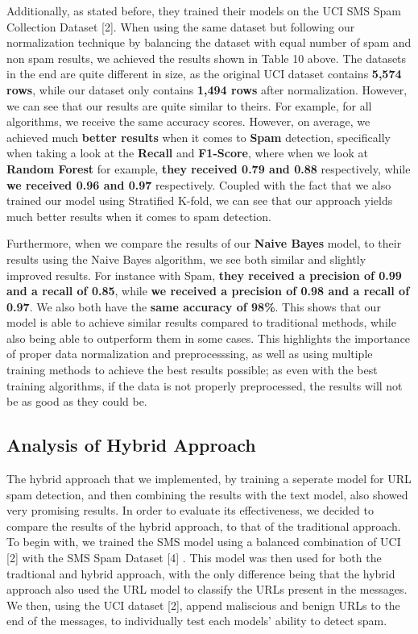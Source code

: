 \documentclass{article}
\begin{document}
\noindent
Additionally, as stated before, they trained their models on the UCI SMS Spam Collection Dataset [2]. When using the same dataset but following our normalization technique by balancing the dataset with equal number of spam and non spam results, we achieved the results shown in Table 10 above. The datasets in the end are quite different in size, as the original UCI dataset contains \textbf{5,574 rows}, while our dataset only contains \textbf{1,494 rows} after normalization. However, we can see that our results are quite similar to theirs. For example, for all algorithms, we receive the same accuracy scores. However, on average, we achieved much \textbf{better results} when it comes to \textbf{Spam} detection, specifically when taking a look at the \textbf{Recall} and \textbf{F1-Score}, where when we look at \textbf{Random Forest} for example, \textbf{they received 0.79 and 0.88} respectively, while \textbf{we received 0.96 and 0.97} respectively. Coupled with the fact that we also trained our model using Stratified K-fold, we can see that our approach yields much better results when it comes to spam detection.
\newline

\noindent
Furthermore, when we compare the results of our \textbf{Naive Bayes} model, to their results using the Naive Bayes algorithm, we see both similar and slightly improved results. For instance with Spam, \textbf{they received a precision of 0.99 and a recall of 0.85}, while \textbf{we received a precision of 0.98 and a recall of 0.97}. We also both have the \textbf{same accuracy of 98\%}. This shows that our model is able to achieve similar results compared to traditional methods, while also being able to outperform them in some cases. This highlights the importance of proper data normalization and preprocesssing, as well as using multiple training methods to achieve the best results possible; as even with the best training algorithms, if the data is not properly preprocessed, the results will not be as good as they could be.

\subsection{Analysis of Hybrid Approach}

\noindent
The hybrid approach that we implemented, by training a seperate model for URL spam detection, and then combining the results with the text model, also showed very promising results. In order to evaluate its effectiveness, we decided to compare the results of the hybrid approach, to that of the traditional approach. To begin with, we trained the SMS model using a balanced combination of UCI [2] with the SMS Spam Dataset [4] . This model was then used for both the tradtional and hybrid approach, with the only difference being that the hybrid approach also used the URL model to classify the URLs present in the messages. We then, using the UCI dataset [2], append maliscious and benign URLs to the end of the messages, to individually test each models' ability to detect spam. 
\end{document}
